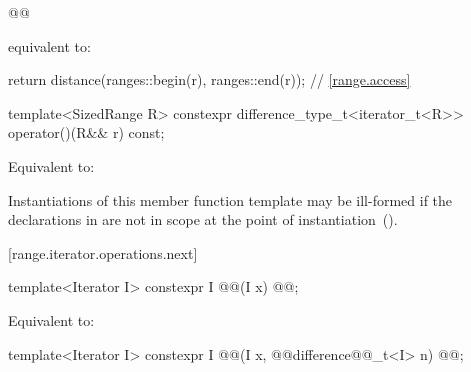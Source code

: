 \begin{addedblock}
\begin{itemdescr}
\pnum
\effects
{}
\begin{codeblock}
@@
\end{codeblock}
 equivalent to:
\begin{codeblock}
return distance(ranges::begin(r), ranges::end(r)); // \ref{range.access}
\end{codeblock}

\end{itemdescr}

{\color{oldclr}
\begin{itemdecl}
template<SizedRange R>
  constexpr difference_type_t<iterator_t<R>> operator()(R&& r) const;
\end{itemdecl}

\begin{itemdescr}
\pnum
\effects
Equivalent to: 

\pnum
\remarks
Instantiations of this member function template may be ill-formed if the
declarations in  are not in scope at the
point of instantiation~().
\end{itemdescr}
} %

[range.iterator.operations.next]{}
%
\pnum
{}

\begin{itemdecl}
template<Iterator I>
  constexpr I @@(I x) @@;
\end{itemdecl}

\begin{itemdescr}
\pnum
\effects Equivalent to: 
\end{itemdescr}

\begin{itemdecl}
template<Iterator I>
  constexpr I @@(I x, @@difference@@_t<I> n) @@;
\end{itemdecl}


\end{addedblock}
